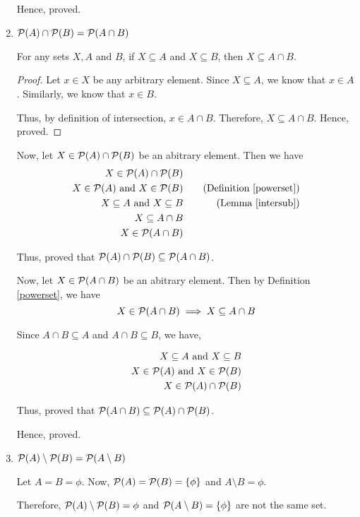 \begin{problem}
\begin{enumerate}
\begin{solution}
				Hence, proved.
			\end{solution}


		\item $\mathcal{P}(A) \cap \mathcal{P}(B) = \mathcal{P}(A \cap B)$
			\begin{solution}
				\begin{lemma}\label{intersub}
					For any sets $X, A$ and $B$, if $X \subseteq A$ and $X \subseteq B$, then $X \subseteq A \cap B$.
				\end{lemma}
				\begin{proof}
					Let $x \in X$ be any arbitrary element.
					Since $X \subseteq A$, we know that $x \in A$.
					Similarly, we know that $x \in B$.

					Thus, by definition of intersection, $x \in A \cap B$. 
					Therefore, $X \subseteq A \cap B$. Hence, proved.
				\end{proof}


				Now, let $X \in \mathcal{P}(A) \cap \mathcal{P}(B)$ be an abitrary element. Then we have 
				\begin{align}
					X \in \mathcal{P}(A) \cap \mathcal{P}(B) \\
					X \in \mathcal{P}(A) \text{ and } X \in \mathcal{P}(B) && \quad \text{(Definition \ref{powerset})}\\
					X \subseteq A \text{ and } X \subseteq B && \quad \text{(Lemma \ref{intersub})} \\
					X \subseteq A \cap B \\
					X \in \mathcal{P}(A \cap B)
				\end{align}

				Thus, proved that $\mathcal{P}(A) \cap \mathcal{P}(B) \subseteq \mathcal{P}(A \cap B)$.

				Now, let $X \in \mathcal{P}(A \cap B)$ be an abitrary element. Then by Definition \ref{powerset}, we have
				$$X \in \mathcal{P}(A \cap B) \implies X \subseteq A \cap B$$

				Since $A \cap B \subseteq A$ and $A \cap B \subseteq B$, we have,

				\begin{align}
					X \subseteq A \text{ and } X \subseteq B \\
					X \in \mathcal{P}(A) \text{ and } X \in \mathcal{P}(B) \\
					X \in \mathcal{P}(A) \cap \mathcal{P}(B)
				\end{align}

				Thus, proved that $\mathcal{P}(A \cap B) \subseteq \mathcal{P}(A) \cap \mathcal{P}(B)$.

				Hence, proved.
			\end{solution}

		\item $\mathcal{P}(A) \setminus \mathcal{P}(B) = \mathcal{P}(A \setminus B)$
			\begin{solution}
				Let $A = B = \phi$. Now, $\mathcal{P}(A) = \mathcal{P}(B) = \{\phi\}$ and $A \setminus B = \phi$.

				Therefore, $\mathcal{P}(A) \setminus \mathcal{P}(B) = \phi$ and $\mathcal{P}(A \setminus B) = \{\phi\}$ are not the same set.
			\end{solution}

	\end{enumerate}
\end{problem}

